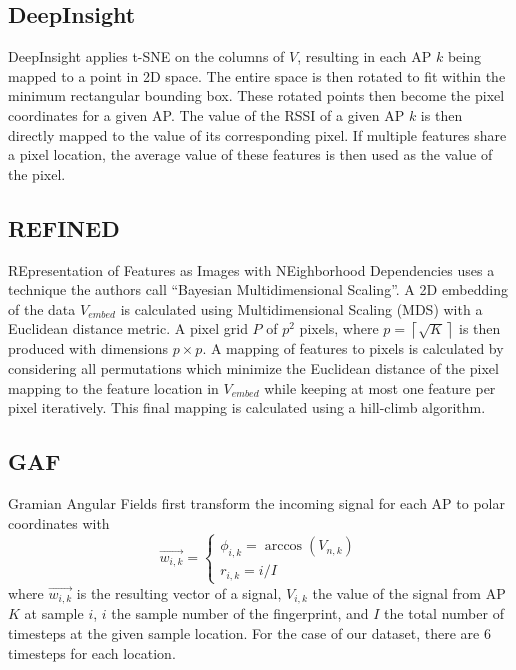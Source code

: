 \subsection{DeepInsight}

DeepInsight \cite{sharma2019deepinsight} applies t-SNE on the columns of $V$, resulting in each AP $k$ being mapped to a point in 2D space.
The entire space is then rotated to fit within the minimum rectangular bounding box.
These rotated points then become the pixel coordinates for a given AP.
The value of the RSSI of a given AP $k$ is then directly mapped to the value of its corresponding pixel.
If multiple features share a pixel location, the average value of these features is then used as the value of the pixel.

\subsection{REFINED}

REpresentation of Features as Images with NEighborhood Dependencies \cite{bazgir2020representation} uses a technique the authors call ``Bayesian Multidimensional Scaling''.
A 2D embedding of the data $V_{embed}$ is calculated using Multidimensional Scaling (MDS) with a Euclidean distance metric.
A pixel grid $P$ of $p^2$ pixels, where $p=\left\lceil \sqrt{K} \right\rceil$ is then produced with dimensions $p \times p$.
A mapping of features to pixels is calculated by considering all permutations which minimize the Euclidean distance of the pixel mapping to the feature location in $V_{embed}$ while keeping at most one feature per pixel iteratively.
This final mapping is calculated using a hill-climb algorithm.

\subsection{GAF}

Gramian Angular Fields \cite{wang2015imaging} first transform the incoming signal for each AP to polar coordinates with
\begin{equation}
	\vec{w_{i, k}} = \begin{cases}
		\phi_{i, k} = \arccos(V_{n, k}) \\
		r_{i, k} = i / I
	\end{cases}
\end{equation}
where $\vec{w_{i, k}}$ is the resulting vector of a signal, $V_{i, k}$ the value of the signal from AP $K$ at sample $i$, $i$ the sample number of the fingerprint, and $I$ the total number of timesteps at the given sample location.
For the case of our dataset, there are 6 timesteps for each location.

